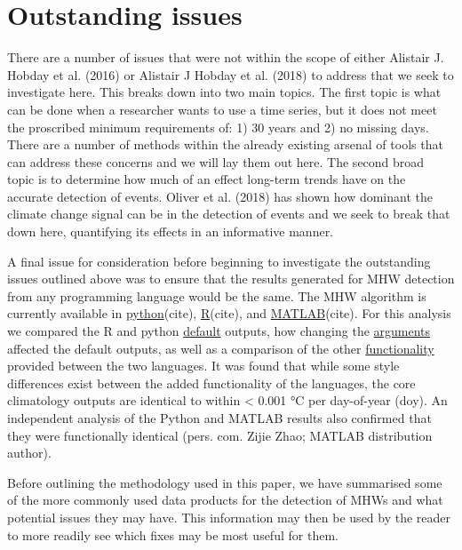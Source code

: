 \documentclass[]{article}
\begin{document}
\section{Outstanding issues}\label{outstanding-issues}

There are a number of issues that were not within the scope of either
Alistair J. Hobday et al. (2016) or Alistair J Hobday et al. (2018) to
address that we seek to investigate here. This breaks down into two main
topics. The first topic is what can be done when a researcher wants to
use a time series, but it does not meet the proscribed minimum
requirements of: 1) 30 years and 2) no missing days. There are a number
of methods within the already existing arsenal of tools that can address
these concerns and we will lay them out here. The second broad topic is
to determine how much of an effect long-term trends have on the accurate
detection of events. Oliver et al. (2018) has shown how dominant the
climate change signal can be in the detection of events and we seek to
break that down here, quantifying its effects in an informative manner.

A final issue for consideration before beginning to investigate the
outstanding issues outlined above was to ensure that the results
generated for MHW detection from any programming language would be the
same. The MHW algorithm is currently available in
\href{https://github.com/ecjoliver/marineHeatWaves}{python}(cite),
\href{https://cran.r-project.org/web/packages/heatwaveR/index.html}{R}(cite),
and \href{https://github.com/ZijieZhaoMMHW/m_mhw1.0}{MATLAB}(cite). For
this analysis we compared the R and python
\href{https://robwschlegel.github.io/MHWdetection/articles/r_vs_python.html}{default}
outputs, how changing the
\href{https://robwschlegel.github.io/MHWdetection/articles/r_vs_python_arguments.html}{arguments}
affected the default outputs, as well as a comparison of the other
\href{https://robwschlegel.github.io/MHWdetection/articles/r_vs_python_additional.html}{functionality}
provided between the two languages. It was found that while some style
differences exist between the added functionality of the languages, the
core climatology outputs are identical to within \textless{} 0.001 °C
per day-of-year (doy). An independent analysis of the Python and MATLAB
results also confirmed that they were functionally identical (pers. com.
Zijie Zhao; MATLAB distribution author).

Before outlining the methodology used in this paper, we have summarised
some of the more commonly used data products for the detection of MHWs
and what potential issues they may have. This information may then be
used by the reader to more readily see which fixes may be most useful
for them.
\end{document}
